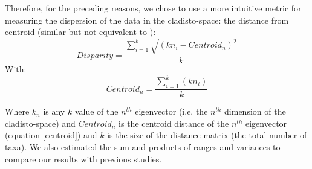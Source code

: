 \documentclass[12pt,letterpaper]{article}
\begin{document}
Therefore, for the preceding reasons, we chose to use a more intuitive metric for measuring the dispersion of the data in the cladisto-space: the distance from centroid (similar but not equivalent to \citealt{Wills1994,kornextinction2013,huang2015origins}): %
\begin{equation}
    Disparity=\frac{\displaystyle\sum_{i=1}^{k}{\sqrt{(kn_{i}-Centroid_{n})^2}}}{k}
\end{equation}
With:
\begin{equation}
    Centroid_{n}=\frac{\displaystyle\sum_{i=1}^{k}(kn_{i})}{k}
    \label{centroid}
\end{equation}

Where $k_{n}$ is any $k$ value of the $n^{th}$ eigenvector (i.e. the $n^{th}$ dimension of the cladisto-space) and $Centroid_{n}$ is the centroid distance of the $n^{th}$ eigenvector (equation \ref{centroid}) and $k$ is the size of the distance matrix (the total number of taxa).
We also estimated the sum and products of ranges and variances to compare our results with previous studies. %


\end{document}
